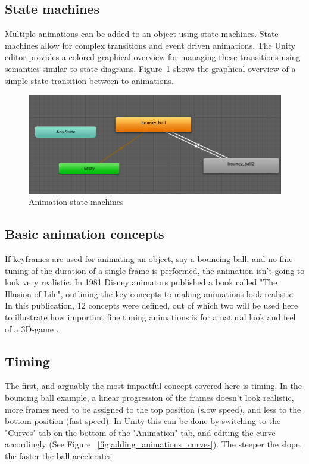 \documentclass[12pt, a4paper, titlepage]{article}
\begin{document}
\subsection{State machines}

Multiple animations can be added to an object using state machines. State machines allow for complex transitions and event driven animations. The Unity editor provides a colored graphical overview for managing these transitions using semantics similar to state diagrams. Figure~\ref{fig:adding_animations_state_machines} shows the graphical overview of a simple state transition between to animations.

\begin{figure}[htbp]
  \centering
  \includegraphics[width=.4\textwidth]{pictures/animation_states}
  \caption{Animation state machines}
  \label{fig:adding_animations_state_machines}
\end{figure}

\subsection{Basic animation concepts}

If keyframes are used for animating an object, say a bouncing ball, and no fine tuning of the duration of a single frame is performed, the animation isn't going to look very realistic. In 1981 Disney animators published a book called "The Illusion of Life", outlining the key concepts to making animations look realistic. In this publication, 12 concepts were defined, out of which two will be used here to illustrate how important fine tuning animations is for a natural look and feel of a 3D-game \cite{b3}.

\subsection{Timing}

The first, and arguably the most impactful concept covered here is timing. In the bouncing ball example, a linear progression of the frames doesn't look realistic, more frames need to be assigned to the top position (slow speed), and less to the bottom position (fast speed). In Unity this can be done by switching to the "Curves" tab on the bottom of the "Animation" tab, and editing the curve accordingly (See Figure ~\ref{fig:adding_animations_curves}). The steeper the slope, the faster the ball accelerates.
\end{document}
